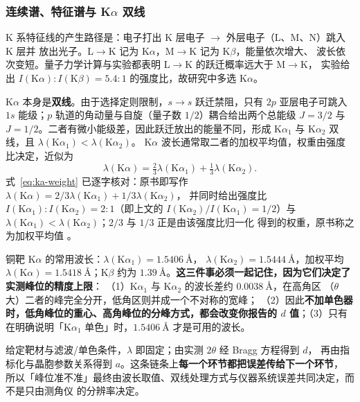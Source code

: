 \subsubsection{连续谱、特征谱与 K$\alpha$ 双线}

K 系特征线的产生路径是：电子打出 K 层电子 $\rightarrow$ 外层电子（L、M、N）跳入 K 层并
放出光子。L$\rightarrow$K 记为 K$\alpha$，M$\rightarrow$K 记为 K$\beta$，能量依次增大、
波长依次变短。量子力学计算与实验都表明 L$\rightarrow$K 的跃迁概率远大于 M$\rightarrow$K，
实验给出 $I(\mathrm{K}\alpha):I(\mathrm{K}\beta)=5.4:1$ 的强度比，故研究中多选 K$\alpha$。

K$\alpha$ 本身是\textbf{双线}。由于选择定则限制，$s\rightarrow s$ 跃迁禁阻，只有 $2p$
亚层电子可跳入 $1s$ 能级；$p$ 轨道的角动量与自旋（量子数 $1/2$）耦合给出两个总能级
$J=3/2$ 与 $J=1/2$。二者有微小能级差，因此跃迁放出的能量不同，形成 K$\alpha_1$ 与
K$\alpha_2$ 双线，且 $\lambda(\mathrm{K}\alpha_1)<\lambda(\mathrm{K}\alpha_2)$。
K$\alpha$ 波长通常取二者的加权平均值，权重由强度比决定，近似为
\begin{equation}
\lambda(\mathrm{K}\alpha)=\tfrac{2}{3}\lambda(\mathrm{K}\alpha_1)
+\tfrac{1}{3}\lambda(\mathrm{K}\alpha_2).
\label{eq:ka-weight}
\end{equation}
式~\eqref{eq:ka-weight} 已逐字核对：原书即写作
$\lambda(\mathrm{K}\alpha)=2/3\lambda(\mathrm{K}\alpha_1)+1/3\lambda(\mathrm{K}\alpha_2)$，
并同时给出强度比 $I(\mathrm{K}\alpha_1):I(\mathrm{K}\alpha_2)=2:1$（即上文的
$I(\mathrm{K}\alpha_2)/I(\mathrm{K}\alpha_1)=1/2$）与
$\lambda(\mathrm{K}\alpha_1)<\lambda(\mathrm{K}\alpha_2)$；$2/3$ 与 $1/3$ 正是由该强度比归一化
得到的权重，原书称之为加权平均值
。

\begin{measure}
铜靶 K$\alpha$ 的常用波长：$\lambda(\mathrm{K}\alpha_1)=\qty{1.5406}{\angstrom}$，
$\lambda(\mathrm{K}\alpha_2)=\qty{1.5444}{\angstrom}$，加权平均
$\lambda(\mathrm{K}\alpha)=\qty{1.5418}{\angstrom}$；K$\beta$ 约为
$\qty{1.39}{\angstrom}$。\textbf{这三件事必须一起记住，因为它们决定了实测峰位的精度上限}：
（1）K$\alpha_1$ 与 K$\alpha_2$ 的波长差约 $\qty{0.0038}{\angstrom}$，在高角区
（$\theta$ 大）二者的峰完全分开，低角区则并成一个不对称的宽峰；
（2）因此\textbf{不加单色器时，低角峰位的重心、高角峰位的分峰方式，都会改变你报告的 $d$
值}；（3）只有在明确说明「K$\alpha_1$ 单色」时，$\qty{1.5406}{\angstrom}$ 才是可用的波长。
\end{measure}

\begin{dataflow}
给定靶材与滤波/单色条件，$\lambda$ 即固定；由实测 $2\theta$ 经 Bragg 方程得到 $d$，
再由指标化与晶胞参数关系得到 $a$。这条链条上\textbf{每一个环节都把误差传给下一个环节}，
所以「峰位准不准」最终由波长取值、双线处理方式与仪器系统误差共同决定，而不是只由测角仪
的分辨率决定。
\end{dataflow}

